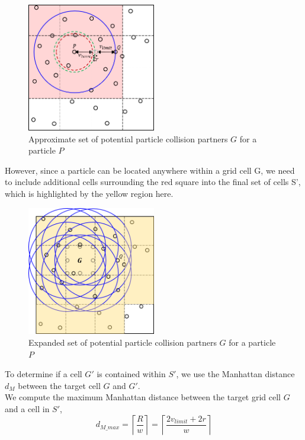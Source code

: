 \documentclass[12pt]{article}
\begin{document}
\begin{figure}[H]
    \centering
    \includegraphics[width=0.5\textwidth]{chap8ApproxCollision}
    \caption{Approximate set of potential particle collision partners $G$ for a particle $P$}
    \label{fig:chap8ApproxCollision}
\end{figure}

However, since a particle can be located anywhere within a grid cell G, we need to include additional cells surrounding the red square into the final set of cells S', which is highlighted by the yellow region here. \\

\begin{figure}[H]
    \centering
    \includegraphics[width=0.5\textwidth]{chap8ExpandedSet}
    \caption{Expanded set of potential particle collision partners $G$ for a particle $P$}
    \label{fig:chap8ExpandedSet}
\end{figure}

To determine if a cell $G'$ is contained within $S'$, we use the Manhattan distance $d_M$ between the target cell $G$ and $G'$. \\

We compute the maximum Manhattan distance between the target grid cell $G$ and a cell in $S'$,
$$d_{M\_max} = \left\lceil{\frac{R}{w}}\right\rceil = \left\lceil{\frac{2v_{limit} + 2r}{w}}\right\rceil$$
\end{document}
